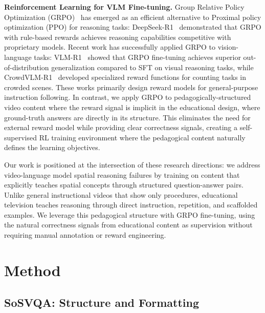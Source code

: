 \documentclass{article}
\begin{document}
\textbf{Reinforcement Learning for VLM Fine-tuning.}
Group Relative Policy Optimization (GRPO)~\cite{shao2024deepseekmath} has emerged as an efficient alternative to Proximal policy optimization (PPO) \cite{schulman2017proximal} for reasoning tasks:  DeepSeek-R1~\cite{deepseek2025r1} demonstrated that GRPO with rule-based rewards achieves reasoning capabilities competitive with proprietary models. Recent work has successfully applied GRPO to vision-language tasks: VLM-R1~\cite{shen2025vlmr1} showed that GRPO fine-tuning achieves superior out-of-distribution generalization compared to SFT on visual reasoning tasks, while CrowdVLM-R1~\cite{liu2025crowdvlm} developed specialized reward functions for counting tasks in crowded scenes. These works primarily design reward models for general-purpose instruction following. In contrast, we apply GRPO to pedagogically-structured video content where the reward signal is implicit in the educational design, where ground-truth answers are directly in its structure. This eliminates the need for external reward model while providing clear correctness signals, creating a self-supervised RL training environment where the pedagogical content naturally defines the learning objectives.

Our work is positioned at the intersection of these research directions: we address video-language model spatial reasoning failures by training on content that explicitly teaches spatial concepts through structured question-answer pairs. Unlike general instructional videos that show only procedures, educational television teaches reasoning through direct instruction, repetition, and scaffolded examples. We leverage this pedagogical structure with GRPO fine-tuning, using the natural correctness signals from educational content as supervision without requiring manual annotation or reward engineering.

\section{Method}


\subsection{SoSVQA: Structure and Formatting}
\end{document}
